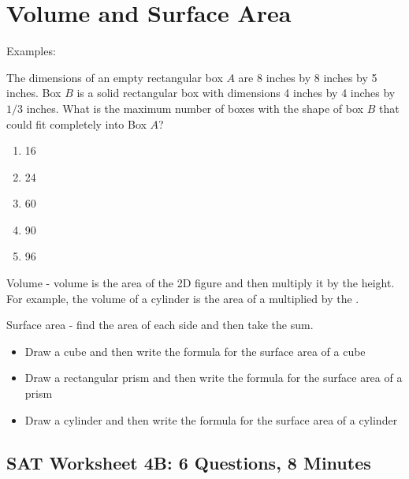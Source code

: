 \newpage
\section{Volume and Surface Area}

Examples:

\begin{multienumerate}
{\medium

The dimensions of an empty rectangular box $A$ are 8 inches by 8 inches by 5 inches. Box $B$ is a solid rectangular box with dimensions 4 inches by 4 inches by $1/3$ inches. What is the maximum number of boxes with the shape of box $B$ that could fit completely into Box $A$?

\begin{enumerate}[label=(\Alph*)]
\item 16
\item 24
\item 60
\item 90
\item 96
\end{enumerate}}
\end{multienumerate}

\hrulefill

\bigskip
Volume - volume is the area of the 2D figure and then multiply it by the height. For example, the volume of a cylinder is the area of a \longline multiplied by the \longline.

\vfill
Surface area - find the area of each side and then take the sum.

\begin{itemize}
\item Draw a cube and then write the formula for the surface area of a cube
\vfill\item Draw a rectangular prism and then write the formula for the surface area of a prism
\vfill\item Draw a cylinder and then write the formula for the surface area of a cylinder
\end{itemize}

\vfill
\pagebreak
\subsection{SAT Worksheet 4B: 6 Questions, 8 Minutes}

